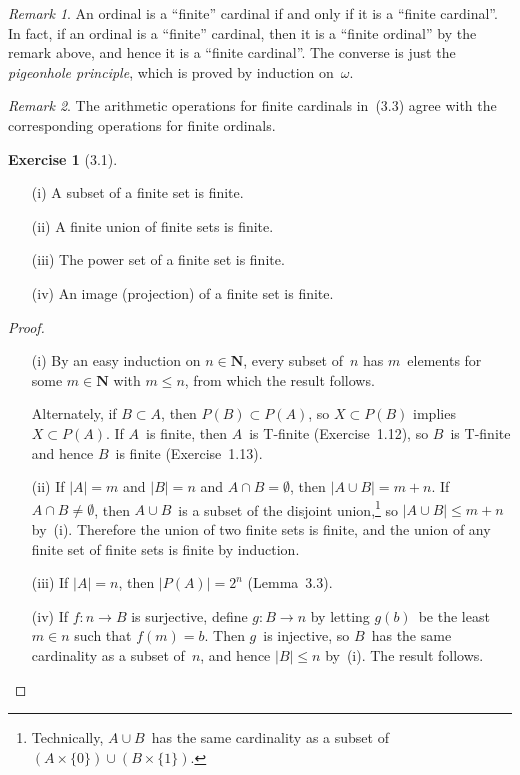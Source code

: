 \documentclass[letterpaper,12pt]{article}
\newcommand{\N}{\boldsymbol{N}}
\renewcommand{\P}{P}
\newcommand{\union}{\cup}
\newcommand{\sect}{\cap}
\newcommand{\card}[1]{|#1|}
\theoremstyle{definition}
\newtheorem*{exer}{Exercise}
\theoremstyle{remark}
\newtheorem*{rmk}{Remark}
\begin{document}
\begin{rmk}
An ordinal is a ``finite'' cardinal if and only if it is a ``finite cardinal''. In fact, if an ordinal is a ``finite'' cardinal, then it is a ``finite ordinal'' by the remark above, and hence it is a ``finite cardinal''. The converse is just the \emph{pigeonhole principle}, which is proved by induction on~\(\omega\).
\end{rmk}

\begin{rmk}
The arithmetic operations for finite cardinals in~(3.3) agree with the corresponding operations for finite ordinals.
\end{rmk}

\begin{exer}[3.1]\
\begin{enumerate}[itemsep=0pt]
\item[(i)] A subset of a finite set is finite.
\item[(ii)] A finite union of finite sets is finite.
\item[(iii)] The power set of a finite set is finite.
\item[(iv)] An image (projection) of a finite set is finite.
\end{enumerate}
\end{exer}
\begin{proof}\
\begin{enumerate}[itemsep=0pt]
\item[(i)] By an easy induction on \(n\in\N\), every subset of~\(n\) has \(m\)~elements for some \(m\in\N\) with \(m\le n\), from which the result follows.

Alternately, if \(B\subset A\), then \(\P(B)\subset\P(A)\), so \(X\subset\P(B)\) implies \(X\subset\P(A)\). If \(A\)~is finite, then \(A\)~is T-finite (Exercise~1.12), so \(B\)~is T-finite and hence \(B\)~is finite (Exercise~1.13).
\item[(ii)] If \(\card{A}=m\) and \(\card{B}=n\) and \(A\sect B=\emptyset\), then \(\card{A\union B}=m+n\). If \(A\sect B\ne\emptyset\), then \(A\union B\)~is a subset of the disjoint union,\footnote{Technically, \(A\union B\)~has the same cardinality as a subset of \((A\times\{0\})\union(B\times\{1\})\).} so \(\card{A\union B}\le m+n\) by~(i). Therefore the union of two finite sets is finite, and the union of any finite set of finite sets is finite by induction.
\item[(iii)] If \(\card{A}=n\), then \(\card{\P(A)}=2^n\) (Lemma~3.3).
\item[(iv)] If \(f:n\to B\) is surjective, define \(g:B\to n\) by letting \(g(b)\)~be the least \(m\in n\) such that \(f(m)=b\). Then \(g\)~is injective, so \(B\)~has the same cardinality as a subset of~\(n\), and hence \(\card{B}\le n\) by~(i). The result follows.\qedhere
\end{enumerate}
\end{proof}
\end{document}
